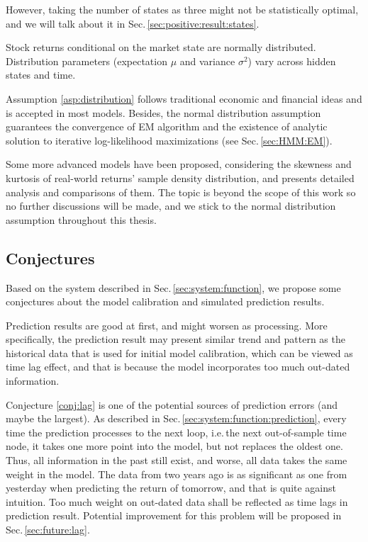 However, taking the number of states as three might not be statistically optimal,
and we will talk about it in Sec.\,\ref{sec:positive:result:states}.

        \begin{asp}
        \label{asp:distribution}
        Stock returns conditional on the market state are normally distributed.
        Distribution parameters (expectation $\mu$ and variance $\sigma^2$) 
        vary across hidden states and time.
        \end{asp}
Assumption \ref{asp:distribution} follows traditional economic and financial ideas 
and is accepted in most models.
Besides, the normal distribution assumption guarantees the convergence of EM algorithm
and the existence of analytic solution to iterative log-likelihood maximizations 
(see Sec.\,\ref{sec:HMM:EM}).

Some more advanced models have been proposed,
considering the skewness and kurtosis of real-world returns' sample density distribution,
and \cite{Kon:1984ih} presents detailed analysis and comparisons of them.
The topic is beyond the scope of this work so no further discussions will be made,
and we stick to the normal distribution assumption throughout this thesis.


\subsection{Conjectures}
\label{sec:positive:aspconj:conj}
Based on the system described in Sec.\,\ref{sec:system:function},
we propose some conjectures about the model calibration and simulated prediction results.

        \begin{conj}
        \label{conj:lag}
        Prediction results are good at first, and might worsen as processing.
        More specifically, the prediction result may present 
        similar trend and pattern as the historical data that is used for initial model calibration,
        which can be viewed as time lag effect, 
        and that is because the model incorporates too much out-dated information.
        \end{conj}
Conjecture \ref{conj:lag} is one of the potential sources of prediction errors (and maybe the largest).
As described in Sec.\,\ref{sec:system:function:prediction},
every time the prediction processes to the next loop, i.e.\,the next out-of-sample time node,
it takes one more point into the model, but not replaces the oldest one.
Thus, all information in the past still exist, and worse,
all data takes the same weight in the model.
The data from two years ago is as significant as one from yesterday 
when predicting the return of tomorrow, and that is quite against intuition.
Too much weight on out-dated data shall be reflected as time lags in prediction result.
Potential improvement for this problem will be proposed in Sec.\,\ref{sec:future:lag}.

